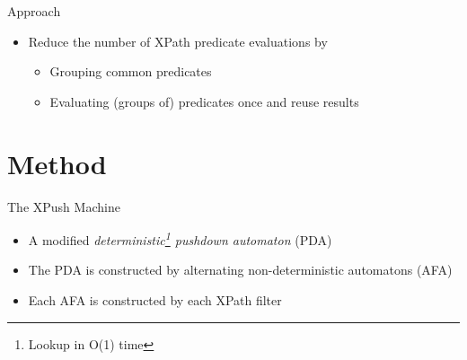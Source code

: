 \documentclass[mathserif,serif]{beamer}
\begin{document}
\begin{frame}{Approach}
  \begin{itemize}
    \item Reduce the number of XPath predicate evaluations by
    \begin{itemize}
      \item Grouping common predicates 
      \item Evaluating (groups of) predicates once and reuse results
    \end{itemize}
  \end{itemize}
\end{frame}

\section{Method}
\begin{frame}{The XPush Machine}
  \begin{itemize}
    \item A modified \emph{deterministic\footnote{Lookup in O(1) time} pushdown automaton} (PDA)
    \item The PDA is constructed by alternating non-deterministic automatons (AFA)
    \item Each AFA is constructed by each XPath filter
  \end{itemize}
\end{frame}
\end{document}
